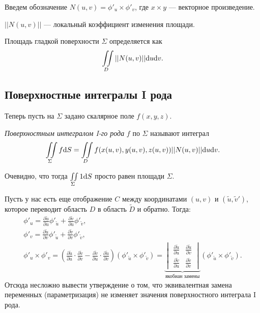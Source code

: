 Введем обозначение $N(u, v) = \phi'_u \times \phi'_v$, где $x \times y$ --- векторное произведение. 
\begin{Def}
$||N(u, v)||$ --- локальный коэффициент изменения площади.
\end{Def}

\begin{Def}
Площадь гладкой поверхности $\Sigma$ определяется как
$$
\iint\limits_D||N(u, v)||\mathrm{d} u \mathrm{d} v.
$$
\end{Def}

\subsection{Поверхностные интегралы I рода}

Теперь пусть на $\Sigma$ задано скалярное поле $f(x, y, z)$.

\begin{Def}
\textit{Поверхностным интегралом I-го рода} $f$ по $\Sigma$ называют интеграл
$$
\iint\limits_{\Sigma}f \mathrm{d} S = \iint\limits_D f(x(u, v), y(u, v), z(u, v)) ||N(u, v)|| \mathrm{d} u \mathrm{d} v.
$$
\end{Def}

\begin{Comment}
Очевидно, что тогда $\iint\limits_{\Sigma}1 \mathrm{d} S$ просто равен площади $\Sigma$. 
\end{Comment}

Пусть у нас есть еще отображение $C$ между координатами $(u, v)$ и $(\tilde u, \tilde v')$, которое переводит область $D$ в область $\widetilde{D}$ и обратно. Тогда:
\begin{gather*}
\phi'_u = \frac{\partial \tilde u}{\partial u} \phi'_{\tilde u} + \frac{\partial \tilde v}{\partial u} \phi'_{\tilde v}, \\
\phi'_v = \frac{\partial \tilde u}{\partial v} \phi'_{\tilde u} + \frac{\partial \tilde v}{\partial v} \phi'_{\tilde v}, \\
\phi'_u \times \phi'_v = \left( \frac{\partial \tilde u}{\partial u} \cdot \frac{\partial \tilde v}{\partial v} - \frac{\partial \tilde v}{\partial u} \cdot \frac{\partial \tilde u}{\partial v} \right) (\phi'_{\tilde u} \times \phi'_{\tilde v}) = \underbrace{\begin{vmatrix}
\frac{\partial \tilde u}{\partial u} & \frac{\partial \tilde u}{\partial v} \\
\frac{\partial \tilde v}{\partial u} & \frac{\partial \tilde v}{\partial v}
\end{vmatrix}}_{\text{якобиан замены}} (\phi'_{\tilde u} \times \phi'_{\tilde v}).
\end{gather*} 
Отсюда несложно вывести утверждение о том, что эквивалентная замена переменных (параметризация) не изменяет значения поверхностного интеграла I рода.

